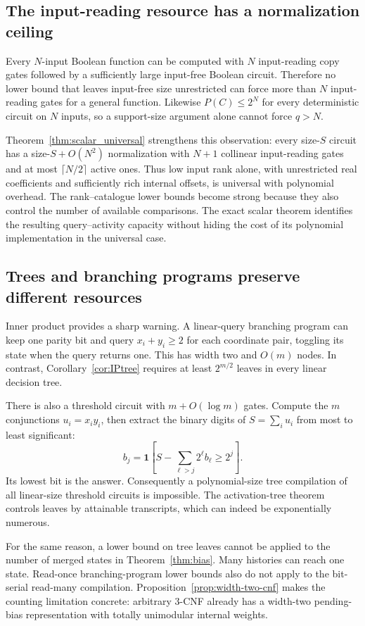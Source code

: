 \documentclass[11pt]{article}
\theoremstyle{definition}
\newcommand{\ind}[1]{\mathbf 1[#1]}
\begin{document}
\subsection{The input-reading resource has a normalization ceiling}
Every \(N\)-input Boolean function can be computed with \(N\) input-reading copy gates followed by a sufficiently large input-free Boolean circuit. Therefore no lower bound that leaves input-free size unrestricted can force more than \(N\) input-reading gates for a general function. Likewise \(P(C)\le2^N\) for every deterministic circuit on \(N\) inputs, so a support-size argument alone cannot force \(q>N\).

Theorem~\ref{thm:scalar_universal} strengthens this observation: every size-\(S\) circuit has a size-\(S+O(N^2)\) normalization with \(N+1\) collinear input-reading gates and at most \(\lceil N/2\rceil\) active ones. Thus low input rank alone, with unrestricted real coefficients and sufficiently rich internal offsets, is universal with polynomial overhead. The rank--catalogue lower bounds become strong because they also control the number of available comparisons. The exact scalar theorem identifies the resulting query--activity capacity without hiding the cost of its polynomial implementation in the universal case.

\subsection{Trees and branching programs preserve different resources}
Inner product provides a sharp warning. A linear-query branching program can keep one parity bit and query \(x_i+y_i\ge2\) for each coordinate pair, toggling its state when the query returns one. This has width two and \(O(m)\) nodes. In contrast, Corollary~\ref{cor:IPtree} requires at least \(2^{m/2}\) leaves in every linear decision tree.

There is also a threshold circuit with \(m+O(\log m)\) gates. Compute the \(m\) conjunctions \(u_i=x_i y_i\), then extract the binary digits of \(S=\sum_i u_i\) from most to least significant:
\[
 b_j=\ind{S-\sum_{\ell>j}2^\ell b_\ell\ge2^j}.
\]
Its lowest bit is the answer. Consequently a polynomial-size tree compilation of all linear-size threshold circuits is impossible. The activation-tree theorem controls leaves by attainable transcripts, which can indeed be exponentially numerous.

For the same reason, a lower bound on tree leaves cannot be applied to the number of merged states in Theorem~\ref{thm:bias}. Many histories can reach one state. Read-once branching-program lower bounds also do not apply to the bit-serial read-many compilation. Proposition~\ref{prop:width-two-cnf} makes the counting limitation concrete: arbitrary 3-CNF already has a width-two pending-bias representation with totally unimodular internal weights.
\end{document}

